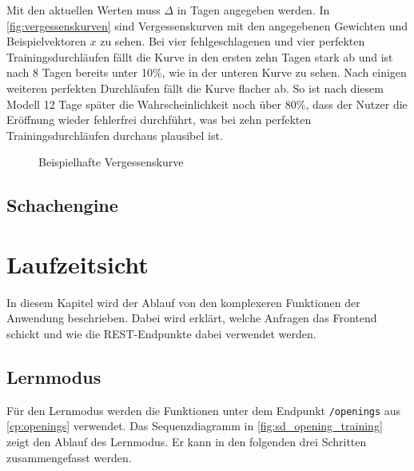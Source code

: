 Mit den aktuellen Werten muss $\Delta$ in Tagen angegeben werden. In \autoref{fig:vergessenskurven} sind Vergessenskurven mit den angegebenen Gewichten und Beispielvektoren $x$ zu sehen. Bei vier fehlgeschlagenen und vier perfekten Trainingsdurchläufen fällt die Kurve in den ersten zehn Tagen stark ab und ist nach 8 Tagen bereits unter 10\%, wie in der unteren Kurve zu sehen. Nach einigen weiteren perfekten Durchläufen fällt die Kurve flacher ab. So ist nach diesem Modell 12 Tage später die Wahrscheinlichkeit noch über 80\%, dass der Nutzer die Eröffnung wieder fehlerfrei durchführt, was bei zehn perfekten Trainingsdurchläufen durchaus plausibel ist.

\begin{figure}[htb]
    
    \caption{Beispielhafte Vergessenskurve}
    \label{fig:vergessenskurven}
\end{figure}

\subsection{Schachengine}

\section{Laufzeitsicht}

In diesem Kapitel wird der Ablauf von den komplexeren Funktionen der Anwendung beschrieben. Dabei wird erklärt, welche Anfragen das Frontend schickt und wie die REST-Endpunkte dabei verwendet werden.

\subsection{Lernmodus}
Für den Lernmodus werden die Funktionen unter dem Endpunkt \lstinline{/openings} aus \autoref{cp:openings} verwendet.
Das Sequenzdiagramm in \autoref{fig:sd_opening_training} zeigt den Ablauf des Lernmodus. Er kann in den folgenden drei Schritten zusammengefasst werden.

